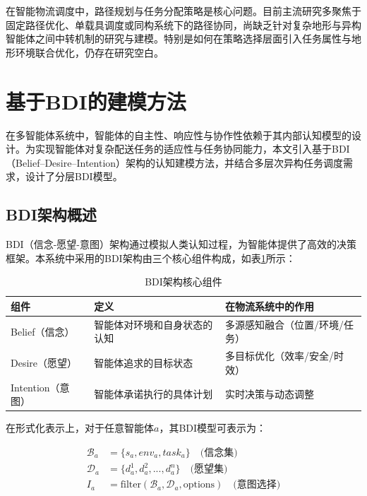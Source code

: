 \documentclass[12pt,a4paper]{article}
\begin{document}
在智能物流调度中，路径规划与任务分配策略是核心问题。目前主流研究多聚焦于固定路径优化、单载具调度或同构系统下的路径协同，尚缺乏针对复杂地形与异构智能体之间中转机制的研究与建模。特别是如何在策略选择层面引入任务属性与地形环境联合优化，仍存在研究空白。

\section{基于BDI的建模方法}

在多智能体系统中，智能体的自主性、响应性与协作性依赖于其内部认知模型的设计。为实现智能体对复杂配送任务的适应性与任务协同能力，本文引入基于BDI（Belief–Desire–Intention）架构的认知建模方法，并结合多层次异构任务调度需求，设计了分层BDI模型。

\subsection{BDI架构概述}

BDI（信念-愿望-意图）架构通过模拟人类认知过程，为智能体提供了高效的决策框架。本系统中采用的BDI架构由三个核心组件构成，如表\ref{tab:bdi-components}所示：

\begin{table}[h]
\centering
\caption{BDI架构核心组件}
\label{tab:bdi-components}
\begin{tabular}{|>{\centering\arraybackslash}p{3cm}|>{\raggedright\arraybackslash}p{5cm}|>{\raggedright\arraybackslash}p{6cm}|}
\hline
\textbf{组件} & \textbf{定义} & \textbf{在物流系统中的作用} \\
\hline
\rowcolor{lightgray}
Belief（信念） & 智能体对环境和自身状态的认知 & 多源感知融合（位置/环境/任务） \\
\hline
Desire（愿望） & 智能体追求的目标状态 & 多目标优化（效率/安全/时效） \\
\hline
\rowcolor{lightgray}
Intention（意图） & 智能体承诺执行的具体计划 & 实时决策与动态调整 \\
\hline
\end{tabular}
\end{table}

在形式化表示上，对于任意智能体$a$，其BDI模型可表示为：

\begin{align}
\mathcal{B}_a &= \{s_a, env_a, task_a\} \quad \text{(信念集)} \\
\mathcal{D}_a &= \{d^1_a, d^2_a, ..., d^n_a\} \quad \text{(愿望集)} \\
I_a &= \text{filter}(\mathcal{B}_a, \mathcal{D}_a, \text{options}) \quad \text{(意图选择)}
\end{align}
\end{document}
